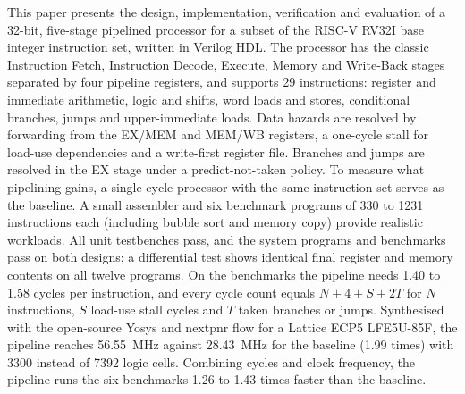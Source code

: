 This paper presents the design, implementation, verification and evaluation of a
32-bit, five-stage pipelined processor for a subset of the RISC-V RV32I base integer
instruction set, written in Verilog HDL. The processor has the classic Instruction Fetch,
Instruction Decode, Execute, Memory and Write-Back stages separated by four pipeline
registers, and supports 29 instructions: register and immediate arithmetic, logic and
shifts, word loads and stores, conditional branches, jumps and upper-immediate loads. Data
hazards are resolved by forwarding from the EX/MEM and MEM/WB registers, a one-cycle stall
for load-use dependencies and a write-first register file. Branches and jumps are resolved
in the EX stage under a predict-not-taken policy. To measure what pipelining gains, a
single-cycle processor with the same instruction set serves as the baseline. A small
assembler and six benchmark programs of 330 to 1231 instructions each (including bubble sort
and memory copy) provide realistic workloads. All unit testbenches pass, and the system programs and benchmarks pass on both designs;
a differential test shows identical final register and memory contents on all twelve
programs. On the benchmarks the pipeline needs 1.40 to 1.58 cycles per instruction, and
every cycle count equals $N + 4 + S + 2T$ for $N$ instructions, $S$ load-use stall cycles and $T$ taken
branches or jumps. Synthesised with the open-source Yosys and nextpnr flow for a Lattice
ECP5 LFE5U-85F, the pipeline reaches 56.55~MHz against 28.43~MHz for the baseline
(1.99 times) with 3300 instead of 7392 logic cells. Combining cycles and clock frequency,
the pipeline runs the six benchmarks 1.26 to 1.43 times faster than the baseline.

